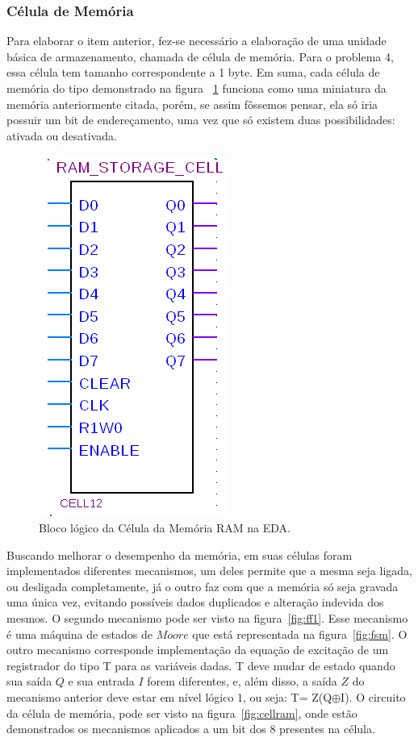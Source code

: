 \documentclass[12pt]{article}
\begin{document}
\subsubsection{Célula de Memória}

Para elaborar o item anterior, fez-se necessário a elaboração de uma unidade básica de armazenamento, chamada de célula de memória. Para o problema 4, essa célula tem tamanho correspondente a 1 byte. Em suma, cada célula de memória do tipo demonstrado na figura ~\ref{fig:celulamemoria} funciona como uma miniatura da memória anteriormente citada, porém, se assim fôssemos pensar, ela só iria possuir um bit de endereçamento, uma vez que só existem duas possibilidades: ativada ou desativada.

\begin{figure}[h]
\centering
\includegraphics[width=.3\textwidth]{img/celulamemoria.png}
\caption{Bloco lógico da Célula da Memória RAM na EDA.}
\label{fig:celulamemoria}
\end{figure}

Buscando melhorar o desempenho da memória, em suas células foram implementados diferentes mecanismos, um deles permite que a mesma seja ligada, ou desligada completamente, já o outro faz com que a memória só seja gravada uma única vez, evitando possíveis dados duplicados e alteração indevida dos mesmos. O segundo mecanismo pode ser visto na figura~\ref{fig:ff1}. Esse mecanismo é uma máquina de estados de $Moore$ que está representada na figura~\ref{fig:fsm}. O outro mecanismo corresponde implementação da equação de excitação de um registrador do tipo T para as variáveis dadas. T deve mudar de estado quando sua saída $Q$ e sua entrada $I$ forem diferentes, e, além disso, a saída $Z$ do mecanismo anterior deve estar em nível lógico 1, ou seja: T= Z(Q$\oplus$I). O circuito da célula de memória, pode ser visto na figura~\ref{fig:cellram}, onde estão demonstrados os mecanismos aplicados a um bit dos 8 presentes na célula.
\end{document}
